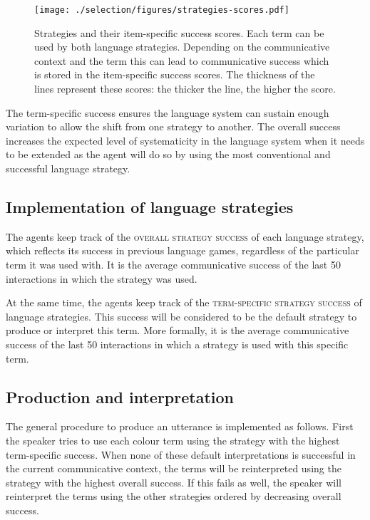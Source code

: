 \begin{figure}[htpb]
  \begin{center}
    \texttt{[image: ./selection/figures/strategies-scores.pdf]}
    \caption[Strategies and their item-specific success
    scores]{Strategies and their item-specific success scores. Each
      term can be used by both language strategies. Depending on the
      communicative context and the term this can lead to
      communicative success which is stored in the item-specific
      success scores. The thickness of the lines represent these
      scores: the thicker the line, the higher the score.}
    \label{f:ls-strategies-and-scores}
  \end{center}
\end{figure}

The term-specific success ensures the language system can sustain
enough variation to allow the shift from one strategy to another. The
overall success increases the expected level of systematicity in the
language system when it needs to be extended as the agent will do so
by using the most conventional and successful language strategy.

\subsection*{Implementation of language strategies}

The agents keep track of the \textsc{overall strategy success} of each
language strategy, which reflects its success in previous language
games, regardless of the particular term it was used with.  It is the
average communicative success of the last 50 interactions in which the
strategy was used.

At the same time, the agents keep track of the \textsc{term-specific
  strategy success} of language strategies. This success will be
considered to be the default strategy to produce or interpret this
term. More formally, it is the average communicative success of the
last 50 interactions in which a strategy is used with this specific
term.

\subsection*{Production and interpretation}

The general procedure to produce an utterance is implemented as
follows. First the speaker tries to use each colour term using the
strategy with the highest term-specific success. When none of these
default interpretations is successful in the current communicative
context, the terms will be reinterpreted using the strategy with the
highest overall success. If this fails as well, the speaker will
reinterpret the terms using the other strategies ordered by
decreasing overall success.

